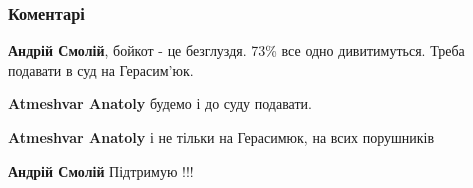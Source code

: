  
 
 
 
 
\subsubsection{Коментарі}
\label{sec:24_07_2021.fb.smolij_andrij.1.bojkot_mova_zakon.cmt}

\begin{itemize}
 
\textbf{Андрій Смолій}, бойкот - це безглуздя. 73\% все одно дивитимуться. Треба подавати в суд на Герасим'юк.

\begin{itemize}

 
\textbf{Atmeshvar Anatoly} будемо і до суду подавати.

 
\textbf{Atmeshvar Anatoly} і не тільки на Герасимюк, на всих порушників
 
\textbf{Андрій Смолій} Підтримую !!!

 

\end{itemize}
\end{itemize}
